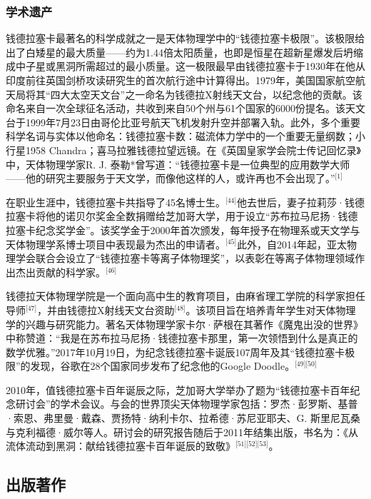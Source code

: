 \subsubsection{学术遗产}
钱德拉塞卡最著名的科学成就之一是天体物理学中的“钱德拉塞卡极限”。该极限给出了白矮星的最大质量——约为1.44倍太阳质量，也即是恒星在超新星爆发后坍缩成中子星或黑洞所需超过的最小质量。这一极限最早由钱德拉塞卡于1930年在他从印度前往英国剑桥攻读研究生的首次航行途中计算得出。1979年，美国国家航空航天局将其“四大太空天文台”之一命名为钱德拉X射线天文台，以纪念他的贡献。该命名来自一次全球征名活动，共收到来自50个州与61个国家的6000份提名。该天文台于1999年7月23日由哥伦比亚号航天飞机发射升空并部署入轨。此外，多个重要科学名词与实体以他命名：钱德拉塞卡数：磁流体力学中的一个重要无量纲数；小行星1958 Chandra；喜马拉雅钱德拉望远镜。在《英国皇家学会院士传记回忆录》中，天体物理学家R. J. 泰勒*曾写道：“钱德拉塞卡是一位典型的应用数学大师——他的研究主要服务于天文学，而像他这样的人，或许再也不会出现了。”\(^\text{[1]}\)

在职业生涯中，钱德拉塞卡共指导了45名博士生。\(^\text{[44]}\)他去世后，妻子拉莉莎·钱德拉塞卡将他的诺贝尔奖金全数捐赠给芝加哥大学，用于设立“苏布拉马尼扬·钱德拉塞卡纪念奖学金”。该奖学金于2000年首次颁发，每年授予在物理系或天文学与天体物理学系博士项目中表现最为杰出的申请者。\(^\text{[45]}\)此外，自2014年起，亚太物理学会联合会设立了“钱德拉塞卡等离子体物理奖”，以表彰在等离子体物理领域作出杰出贡献的科学家。\(^\text{[46]}\)

钱德拉天体物理学院是一个面向高中生的教育项目，由麻省理工学院的科学家担任导师\(^\text{[47]}\)，并由钱德拉X射线天文台资助\(^\text{[48]}\)。该项目旨在培养青年学生对天体物理学的兴趣与研究能力。著名天体物理学家卡尔·萨根在其著作《魔鬼出没的世界》中称赞道：“我是在苏布拉马尼扬·钱德拉塞卡那里，第一次领悟到什么是真正的数学优雅。”2017年10月19日，为纪念钱德拉塞卡诞辰107周年及其“钱德拉塞卡极限”的发现，谷歌在28个国家同步发布了纪念他的Google Doodle。\(^\text{[49][50]}\)

2010年，值钱德拉塞卡百年诞辰之际，芝加哥大学举办了题为“钱德拉塞卡百年纪念研讨会”的学术会议。与会的世界顶尖天体物理学家包括：罗杰·彭罗斯、基普·索恩、弗里曼·戴森、贾扬特·纳利卡尔、拉希德·苏尼亚耶夫、G. 斯里尼瓦桑与克利福德·威尔等人。研讨会的研究报告随后于2011年结集出版，书名为：《从流体流动到黑洞：献给钱德拉塞卡百年诞辰的致敬》\(^\text{[51][52][53]}\)。
\subsection{出版著作}
